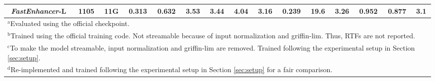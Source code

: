 \begin{table}[t]
\begin{tabular}{c|c|c|c|c|c|c|c|c|c|c|c|c|c|c}
        \textit{FastEnhancer}-L & 1105 & 11G & 0.313 & 0.632 & \textbf{3.53} & \textbf{3.44} & \textbf{4.04} & \textbf{3.16} & \textbf{0.239} & \textbf{19.6} & \textbf{3.26} & \textbf{0.952} & \textbf{0.877} & 3.1 \\
        \hline
        \multicolumn{15}{l}{$^{\mathrm{a}}$Evaluated using the official checkpoint.} \\
        \multicolumn{15}{l}{$^{\mathrm{b}}$Trained using the official training code. Not streamable because of input normalization and griffin-lim. Thus, RTFs are not reported.} \\
        \multicolumn{15}{l}{$^{\mathrm{c}}$To make the model streamable, input normalization and griffin-lim are removed. Trained following the experimental setup in Section \ref{sec:setup}.} \\
        \multicolumn{15}{l}{$^{\mathrm{d}}$Re-implemented and trained following the experimental setup in Section \ref{sec:setup} for a fair comparison.} \\
    \end{tabular}
\end{table}